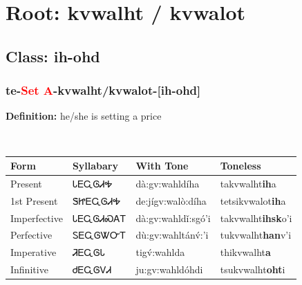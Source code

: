 \needspace{4in}
\section*{Root: kvwalht / kvwalot}
\nopagebreak
{}
\needspace{3in}
\subsection*{Class: ih-ohd}
\nopagebreak
\needspace{2in}
\subsubsection*{te{-}\textcolor{Red}{Set A}{-}\textbf{kvwalht/kvwalot}{-}[ih-ohd]}
\nopagebreak
\textbf{Definition: } he/she is setting a price
\\[0.5em]
\begin{tabularx}{\textwidth}{l X X X}%
\toprule%
\textbf{Form}&\textbf{Syllabary}&\textbf{With Tone}&\textbf{Toneless}\\%
\midrule%
Present&ᏓᎬᏩᎶᏗᎭ&dà:gv:wahldíha&takvwalht\textbf{ih}a\\%
1st Present&ᏕᏥᎬᏩᎶᏗᎭ&de:jígv:walò:díha&tetsikvwalot\textbf{ih}a\\%
Imperfective&ᏓᎬᏩᎶᏗᏍᎪᎢ&dà:gv:wahldǐ:sgó’i&takvwalht\textbf{ihsk}o'i\\%
Perfective&ᏚᎬᏩᎶᏔᏅᎢ&dù:gv:wahltánv́:’i&tukvwalht\textbf{han}v'i\\%
Imperative&ᏘᎬᏩᎶᏓ&tigv́:wahlda&thikvwalht\textbf{a}\\%
Infinitive&ᏧᎬᏩᎶᏙᏗ&ju:gv:wahldóhdi&tsukvwalht\textbf{oht}i\\%
\bottomrule%
\end{tabularx}
\\[1em]